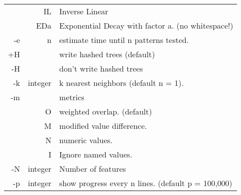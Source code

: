 \documentclass{article}
\begin{document}
\begin{tabular}{|r|r|l|}
   & IL  & Inverse Linear \\
   & EDa & Exponential Decay with factor a. (no whitespace!) \\
-e & n   &  estimate time until n patterns tested. \\
+H & & write hashed trees (default) \\
-H & & don't write hashed trees  \\
-k & integer & k nearest neighbors (default n = 1). \\
-m &   &  metrics \\
   & O & weighted overlap. (default) \\
   & M & modified value difference. \\
   & N & numeric values. \\ 
   & I & Ignore named  values. \\
-N & integer & Number of features \\
-p & integer & show progress every n lines. (default p = 100,000) \\
\hline
\end{tabular}

\newpage
\end{document}
